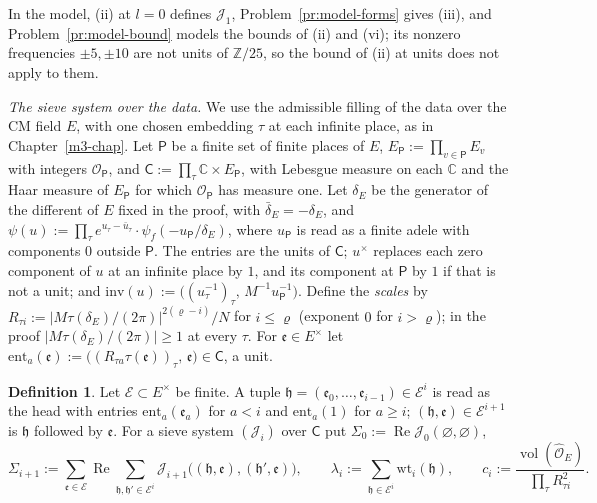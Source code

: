 \documentclass[reqno]{amsart}
\newcounter{chap}
\theoremstyle{definition}
\newtheorem{definition}{Definition}[section]
\theoremstyle{plain}
\theoremstyle{remark}
\newcommand{\Z}{\mathbb{Z}}
\newcommand{\C}{\mathbb{C}}
\newcommand{\Jc}{\mathcal{J}}
\newcommand{\hh}{\mathfrak{h}}
\newcommand{\Ec}{\mathcal{E}}
\newcommand{\Oh}{\hat{\mathcal O}_E}
\newcommand{\Pf}{\mathsf{P}}
\newcommand{\OP}{\mathcal{O}_{\mathsf P}}
\newcommand{\EP}{E_{\mathsf P}}
\newcommand{\wt}{\mathrm{wt}}
\newcommand{\ent}{\mathrm{ent}}
\newcommand{\Cs}{\mathsf{C}}
\newcommand{\inv}{\mathrm{inv}}
\newcommand{\ee}{\mathfrak{e}}
\newcommand{\vol}{\operatorname{vol}}
\begin{document}
In the model, (ii) at \(l=0\) defines \(\Jc_1\), Problem~\ref{pr:model-forms} gives (iii), and Problem~\ref{pr:model-bound} models the bounds of (ii) and (vi); its nonzero frequencies \(\pm5,\pm10\) are not units of \(\Z/25\), so the bound of (ii) at units does not apply to them.

\emph{The sieve system over the data.}  We use the admissible filling of the data over the CM field \(E\), with one chosen embedding \(\tau\) at each infinite place, as in Chapter~\ref{m3-chap}.  Let \(\Pf\) be a finite set of finite places of \(E\), \(\EP:=\prod_{v\in\Pf}E_v\) with integers \(\OP\), and \(\Cs:=\prod_\tau\C\times\EP\), with Lebesgue measure on each \(\C\) and the Haar measure of \(\EP\) for which \(\OP\) has measure one.  Let \(\delta_E\) be the generator of the different of \(E\) fixed in the proof, with \(\bar\delta_E=-\delta_E\), and \(\psi(u):=\prod_\tau e^{u_\tau-\bar u_\tau}\cdot\psi_f(-u_\Pf/\delta_E)\), where \(u_\Pf\) is read as a finite adele with components \(0\) outside \(\Pf\).  The entries are the units of \(\Cs\); \(u^\times\) replaces each zero component of \(u\) at an infinite place by \(1\), and its component at \(\Pf\) by \(1\) if that is not a unit; and \(\inv(u):=\bigl((u_\tau^{-1})_\tau,\,M^{-1}u_\Pf^{-1}\bigr)\).  Define the \emph{scales} by \(R_{\tau i}:=\lvert M\tau(\delta_E)/(2\pi)\rvert^{2(\varrho-i)}/N\) for \(i\le\varrho\) (exponent \(0\) for \(i>\varrho\)); in the proof \(\lvert M\tau(\delta_E)/(2\pi)\rvert\ge1\) at every \(\tau\).  For \(\ee\in E^\times\) let \(\ent_a(\ee):=\bigl((R_{\tau a}\tau(\ee))_\tau,\,\ee\bigr)\in\Cs\), a unit.

\begin{definition}\label{def:density-sums}
Let \(\Ec\subset E^\times\) be finite.  A tuple \(\hh=(\ee_0,\dots,\ee_{i-1})\in\Ec^i\) is read as the head with entries \(\ent_a(\ee_a)\) for \(a<i\) and \(\ent_a(1)\) for \(a\ge i\); \((\hh,\ee)\in\Ec^{i+1}\) is \(\hh\) followed by \(\ee\).  For a sieve system \((\Jc_i)\) over \(\Cs\) put \(\Sigma_0:=\operatorname{Re}\Jc_0(\varnothing,\varnothing)\),
\[
 \Sigma_{i+1}:=\sum_{\ee\in\Ec}\operatorname{Re}\sum_{\hh,\hh'\in\Ec^i}\Jc_{i+1}\bigl((\hh,\ee),(\hh',\ee)\bigr),\qquad \lambda_i:=\sum_{\hh\in\Ec^i}\wt_i(\hh),\qquad c_i:=\frac{\vol(\Oh)}{\prod_\tau R_{\tau i}^2}.
\]
\end{definition}
\end{document}
